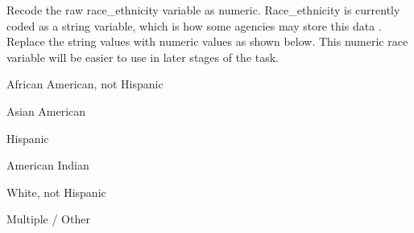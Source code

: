 \documentclass[12pt]{article}
\begin{document}
Recode the raw race\_ethnicity variable as numeric. Race\_ethnicity is currently coded as a string variable, which is how some 
agencies may store this data . Replace the string values with numeric values as shown below. This numeric race variable will 
be easier to use in later stages of the task. \\

\begin{description}
\setlength{\parskip}{-6pt}
\item [1=] African American, not Hispanic
\item [2=] Asian American
\item [3=] Hispanic
\item [4=] American Indian
\item [5=] White, not Hispanic
\item [6=] Multiple / Other
\end{description}
\end{document}
